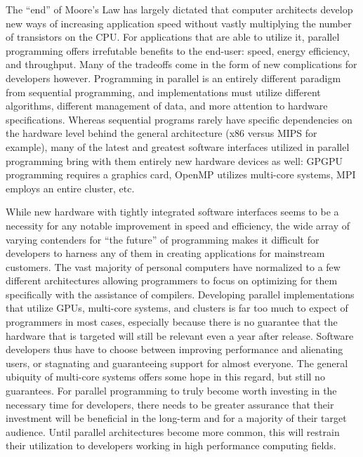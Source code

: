 \documentclass[12pt]{article}
\begin{document}
The ``end'' of Moore's Law has largely dictated that computer architects develop new ways of increasing application speed without vastly multiplying the number of transistors on the CPU. For applications that are able to utilize it, parallel programming offers irrefutable benefits to the end-user: speed, energy efficiency, and throughput. Many of the tradeoffs come in the form of new complications for developers however. Programming in parallel is an entirely different paradigm from sequential programming, and implementations must utilize different algorithms, different management of data,  and more attention to hardware specifications. Whereas sequential programs rarely have specific dependencies on the hardware level behind the general architecture (x86 versus MIPS for example), many of the latest and greatest software interfaces utilized in parallel programming bring with them entirely new hardware devices as well: GPGPU programming requires a graphics card, OpenMP utilizes multi-core systems, MPI employs an entire cluster, etc.       

While new hardware with tightly integrated software interfaces seems to be a necessity for any notable improvement in speed and efficiency, the wide array of varying contenders for ``the future'' of programming makes it difficult for developers to harness any of them in creating applications for mainstream customers. The vast majority of personal computers have normalized to a few different architectures allowing programmers to focus on optimizing for them specifically with the assistance of compilers. Developing parallel implementations that utilize GPUs, multi-core systems, and clusters is far too much to expect of programmers in most cases, especially because there is no guarantee that the hardware that is targeted will still be relevant even a year after release. Software developers thus have to choose between improving performance and alienating users, or stagnating and guaranteeing support for almost everyone. The general ubiquity of multi-core systems offers some hope in this regard, but still no guarantees. For parallel programming to truly become worth investing in  the necessary time for developers, there needs to be greater assurance that their investment will be beneficial in the long-term and for a majority of their target audience. Until parallel architectures become more common, this will restrain their utilization to developers working in high performance computing fields. 
\end{document}
